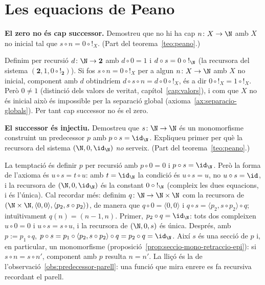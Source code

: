 \section{Les equacions de Peano}\label{prac:peano}

\begin{exercici}
\textbf{El zero no és cap successor.} Demostreu que no hi ha cap \(n\colon X\to\N\) amb \(X\) no inicial tal que \(s\circ n=0\circ{!}_X\). (Part del teorema~\ref{teo:peano}.)
\end{exercici}
\begin{solucio}
Definim per recursió \(d\colon\N\to\mathbf2\) amb \(d\circ0=1\) i \(d\circ s=0\circ{!}_\N\) (la recursora del sistema \((\mathbf2,1,0\circ{!}_{\mathbf2})\)). Si fos \(s\circ n=0\circ{!}_X\) per a algun \(n\colon X\to\N\) amb \(X\) no inicial, component amb \(d\) obtindríem \(d\circ s\circ n=d\circ0\circ{!}_X\), és a dir \(0\circ{!}_X=1\circ{!}_X\). Però \(0\neq1\) (distinció dels valors de veritat, capítol~\ref{cap:valors}), i com que \(X\) no és inicial això és impossible per la separació global (axioma~\ref{ax:separacio-globals}). Per tant cap successor no és el zero.
\end{solucio}

\begin{exercici}
\textbf{El successor és injectiu.} Demostreu que \(s\colon\N\to\N\) és un monomorfisme construint un predecessor \(p\) amb \(p\circ s=\id_\N\). Expliqueu primer per què la recursora del sistema \((\N,0,\id_\N)\) \emph{no} serveix. (Part del teorema~\ref{teo:peano}.)
\end{exercici}
\begin{solucio}
La temptació és definir \(p\) per recursió amb \(p\circ0=0\) i \(p\circ s=\id_\N\). Però la forma de l'axioma és \(u\circ s=t\circ u\): amb \(t=\id_\N\) la condició és \(u\circ s=u\), no \(u\circ s=\id\), i la recursora de \((\N,0,\id_\N)\) és la constant \(0\circ{!}_\N\) (compleix les dues equacions, i és l'única). Cal recordar més: definim \(q\colon\N\to\N\times\N\) com la recursora de \((\N\times\N,\langle0,0\rangle,\langle p_2,s\circ p_2\rangle)\), de manera que \(q\circ0=\langle0,0\rangle\) i \(q\circ s=\langle p_2,s\circ p_2\rangle\circ q\); intuïtivament \(q(n)=(n-1,n)\). Primer, \(p_2\circ q=\id_\N\): tots dos compleixen \(u\circ0=0\) i \(u\circ s=s\circ u\), i la recursora de \((\N,0,s)\) és única. Després, amb \(p:=p_1\circ q\), \(p\circ s=p_1\circ\langle p_2,s\circ p_2\rangle\circ q=p_2\circ q=\id_\N\). Així \(s\) és una secció de \(p\) i, en particular, un monomorfisme (proposició~\ref{prop:seccio-mono-retraccio-epi}): si \(s\circ n=s\circ n'\), component amb \(p\) resulta \(n=n'\). La lliçó és la de l'observació~\ref{obs:predecessor-parell}: una funció que mira enrere es fa recursiva recordant el parell.
\end{solucio}

